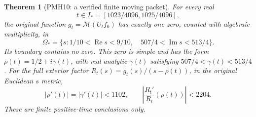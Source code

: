 \documentclass[11pt]{article}
\newtheorem{theorem}{Theorem}
\newcommand{\Rea}{\operatorname{Re}}
\newcommand{\Ima}{\operatorname{Im}}
\newcommand{\Mell}{\mathcal M}
\begin{document}
\begin{theorem}[PMH10: a verified finite moving packet]
\label{PMH10}
For every real
\begin{equation}\label{PMH10-time}
 t\in I_*=[1023/4096,1025/4096],
\end{equation}
the original function $g_t=\Mell(U_tf_0)$ has exactly one zero,
counted with algebraic multiplicity, in
\begin{equation}\label{PMH10-rectangle}
 \Omega_*=
 \{s:1/10<\Rea s<9/10,\quad507/4<\Ima s<513/4\}.
\end{equation}
Its boundary contains no zero. This zero is simple and has the form
$\rho(t)=1/2+i\gamma(t)$, with real analytic $\gamma(t)$ satisfying
$507/4<\gamma(t)<513/4$. For the full exterior factor
$R_t(s)=g_t(s)/(s-\rho(t))$, in the original Euclidean $s$ metric,
\begin{equation}\label{PMH10-speed}
 |\rho'(t)|=|\gamma'(t)|<1102,\qquad
 \left|\frac{R_t'}{R_t}(\rho(t))\right|<2204.
\end{equation}
These are finite positive-time conclusions only.
\end{theorem}
\end{document}
